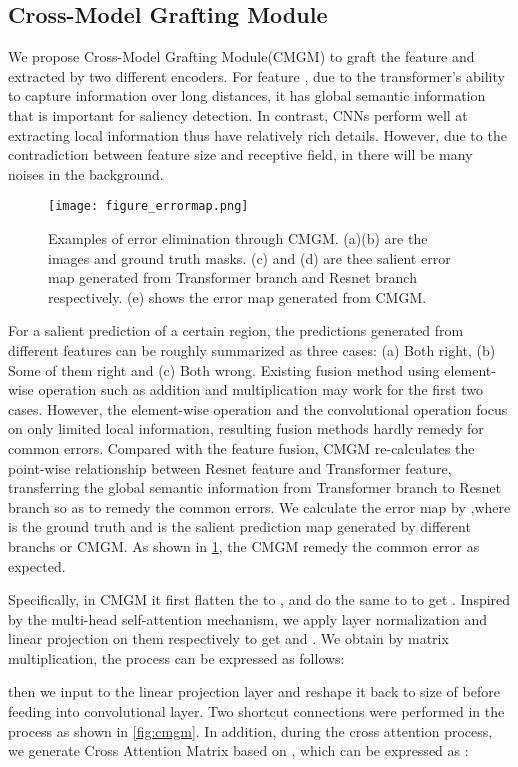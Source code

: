 \documentclass[10pt,twocolumn,letterpaper]{article}
\begin{document}
\subsection{Cross-Model Grafting Module}
We propose Cross-Model Grafting Module(CMGM) to graft the feature  and  extracted by two different encoders. For feature , due to the transformer's ability to capture information over long distances, it has global semantic information that is important for saliency detection. In contrast, CNNs perform well at extracting local information thus  have relatively rich details. However, due to the contradiction between feature size and receptive field, in  there will be many noises in the background.
\begin{figure}[t]
\centering
\texttt{[image: figure\_errormap.png]}
\caption{Examples of error elimination through CMGM. (a)(b) are the images and ground truth masks. (c) and (d) are thee salient error map generated from Transformer branch and Resnet branch respectively. (e) shows the error map generated from CMGM.}
\label{fig:cmgm:errormap}
\end{figure}
For a salient prediction of a certain region, the predictions generated from different features can be
roughly summarized as three cases: (a) Both right, (b) Some of them right and (c) Both wrong. Existing fusion method using element-wise operation such as addition and multiplication may work for the first two cases. However, the element-wise operation and the convolutional operation focus on only limited local information, resulting fusion methods hardly remedy for common errors. Compared with the feature fusion, 
CMGM re-calculates the point-wise relationship between Resnet feature and Transformer feature, transferring the global semantic information from Transformer branch to Resnet branch so as to remedy the common errors. We calculate the error map by ,where  is the ground truth and  is the salient prediction map generated by different branchs or CMGM. As shown in \cref{fig:cmgm:errormap}, the CMGM remedy the common error as expected.


Specifically, in CMGM it first flatten the  to , and do the same to  to get . Inspired by the multi-head self-attention mechanism, we apply layer normalization and linear projection on them respectively to get  and . We obtain  by matrix multiplication, the process can be expressed as follows:


then we input  to the linear projection layer and reshape it back to size of  before feeding into convolutional layer. Two shortcut connections were performed in the process as shown in \cref{fig:cmgm}. In addition, during the cross attention process, we generate Cross Attention Matrix based on , which can be expressed as :
\end{document}
